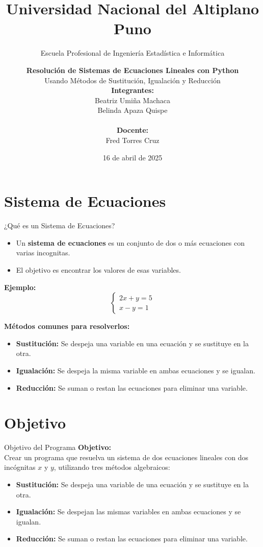 \documentclass{beamer}
\title{Universidad Nacional del Altiplano Puno}
\subtitle{Escuela Profesional de Ingeniería Estadística e Informática}
\author{
  \textbf{Resolución de Sistemas de Ecuaciones Lineales con Python} \\
  Usando Métodos de Sustitución, Igualación y Reducción \\
  \vspace{0.5cm}
  \textbf{Integrantes:} \\
  Beatriz Umiña Machaca \\
  Belinda Apaza Quispe \\
  \\
  \textbf{Docente:} \\
  Fred Torres Cruz
}
\institute{}
\date{16 de abril de 2025}
\begin{document}
\frame{\titlepage}


\section{Sistema de Ecuaciones}
\begin{frame}{¿Qué es un Sistema de Ecuaciones?}
  \begin{itemize}
    \item Un \textbf{sistema de ecuaciones} es un conjunto de dos o más ecuaciones con varias incognitas.
    \item El objetivo es encontrar los valores de esas variables.
  \end{itemize}
  
  \vspace{0.3cm}
  \textbf{Ejemplo:}
  \[
    \begin{cases}
      2x + y = 5 \\
      x - y = 1
    \end{cases}
  \]

  \vspace{0.3cm}
  \textbf{Métodos comunes para resolverlos:}
  \begin{itemize}
    \item \textbf{Sustitución:} Se despeja una variable en una ecuación y se sustituye en la otra.
    \item \textbf{Igualación:} Se despeja la misma variable en ambas ecuaciones y se igualan.
    \item \textbf{Reducción:} Se suman o restan las ecuaciones para eliminar una variable.
  \end{itemize}
\end{frame}


\section{Objetivo}
\begin{frame}{Objetivo del Programa}
  \textbf{Objetivo:} \\
  Crear un programa que resuelva un sistema de dos ecuaciones lineales con dos incógnitas \(x\) y \(y\), utilizando tres métodos algebraicos:
  \begin{itemize}
    \item \textbf{Sustitución:} Se despeja una variable de una ecuación y se sustituye en la otra.
    \item \textbf{Igualación:} Se despejan las mismas variables en ambas ecuaciones y se igualan.
    \item \textbf{Reducción:} Se suman o restan las ecuaciones para eliminar una variable.
  \end{itemize}
\end{frame}
\end{document}
